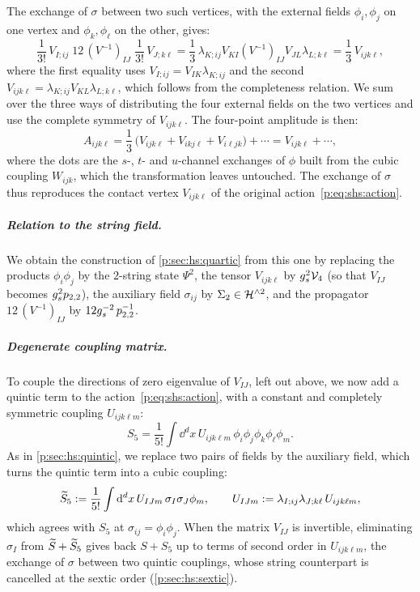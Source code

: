 The exchange of $\sigma$ between two such vertices, with the external fields $\phi_i, \phi_j$ on one vertex and $\phi_k, \phi_\ell$ on the other, gives:
\begin{equation}
\label{p:eq:shs:channel}
\frac{1}{3!} \, V_{I;ij} \;
12 \, (V^{-1})_{IJ} \;
\frac{1}{3!} \, V_{J;k\ell}
  = \frac{1}{3} \, \lambda_{K;ij} V_{KI} (V^{-1})_{IJ} V_{JL} \lambda_{L;k\ell}
  = \frac{1}{3} \, V_{ijk\ell},
\end{equation}
where the first equality uses $V_{I;ij} = V_{IK} \lambda_{K;ij}$ and the second $V_{ijk\ell} = \lambda_{K;ij} V_{KL} \lambda_{L;k\ell}$, which follows from the completeness relation.
We sum over the three ways of distributing the four external fields on the two vertices and use the complete symmetry of $V_{ijk\ell}$.
The four-point amplitude is then:
\begin{equation}
\label{p:eq:shs:A4}
A_{ijk\ell}
  = \frac{1}{3} \, \big( V_{ijk\ell} + V_{ikj\ell} + V_{i\ell jk} \big) + \cdots
  = V_{ijk\ell} + \cdots,
\end{equation}
where the dots are the $s$-, $t$- and $u$-channel exchanges of $\phi$ built from the cubic coupling $W_{ijk}$, which the transformation leaves untouched.
The exchange of $\sigma$ thus reproduces the contact vertex $V_{ijk\ell}$ of the original action~\eqref{p:eq:shs:action}.


\subparagraph{Relation to the string field.}

We obtain the construction of \cref{p:sec:hs:quartic} from this one by replacing the products $\phi_i \phi_j$ by the $2$-string state $\Psi^2$, the tensor $V_{ijk\ell}$ by $\gs^2 \vertex{4}$ (so that $V_{IJ}$ becomes $\gs^2 \sprod{2}{2}$), the auxiliary field $\sigma_{ij}$ by $\Sigma_2 \in \Hn{2}$, and the propagator $12 \, (V^{-1})_{IJ}$ by $12 \gs^{-2} \, \sprod{2}{2}^{-1}$.



\subparagraph{Degenerate coupling matrix.}

To couple the directions of zero eigenvalue of $V_{IJ}$, left out above, we now add a quintic term to the action~\eqref{p:eq:shs:action}, with a constant and completely symmetric coupling $U_{ijk\ell m}$:
\begin{equation}
\label{p:eq:shs:S5}
S_5
  = \frac{1}{5!} \int \dd^d x \, U_{ijk\ell m} \, \phi_i \phi_j \phi_k \phi_\ell \phi_m.
\end{equation}
As in \cref{p:sec:hs:quintic}, we replace two pairs of fields by the auxiliary field, which turns the quintic term into a cubic coupling:
\begin{equation}
\label{p:eq:shs:S5tilde}
\caction[5]
  := \frac{1}{5!} \int \dd^d x \, U_{IJm} \, \sigma_I \sigma_J \phi_m,
\qquad
U_{IJm}
  := \lambda_{I;ij} \lambda_{J;k\ell} \, U_{ijk\ell m},
\end{equation}
which agrees with $S_5$ at $\sigma_{ij} = \phi_i \phi_j$.
When the matrix $V_{IJ}$ is invertible, eliminating $\sigma_I$ from $\caction + \caction[5]$ gives back $S + S_5$ up to terms of second order in $U_{ijk\ell m}$, the exchange of $\sigma$ between two quintic couplings, whose string counterpart is cancelled at the sextic order (\cref{p:sec:hs:sextic}).

